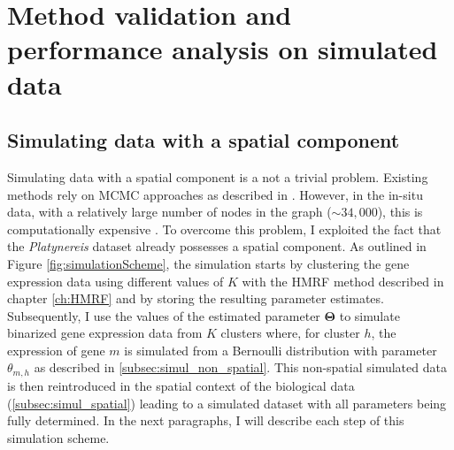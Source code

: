 \chapter{Method validation and performance analysis on simulated data}\label{ch:simulations} 

\section{Simulating data with a spatial component }
Simulating data with a spatial component is a not a trivial problem. Existing methods rely on MCMC approaches as described in \cite{Chalmond89}. However, in the \platy{} in-situ data, with a relatively large number of nodes in the graph ($\sim 34,000$), this is computationally expensive \cite{belloni09}. To overcome this problem, I exploited the fact that the {\it{Platynereis}} dataset already possesses a spatial component. As outlined in Figure \ref{fig:simulationScheme}, the simulation starts by clustering the gene expression data using different values of $K$ with the HMRF method described in chapter \ref{ch:HMRF} and by storing the resulting parameter estimates. Subsequently, I use the values of the estimated parameter $\boldsymbol{\Theta}$ to simulate binarized gene expression data from $K$ clusters where, for cluster $h$, the expression of gene $m$ is simulated from a Bernoulli distribution with parameter $\theta_{m,h}$ as described in \ref{subsec:simul_non_spatial}. This non-spatial simulated data is then reintroduced in the spatial context of the biological data (\ref{subsec:simul_spatial}) leading to a simulated dataset with all parameters being fully determined. In the next paragraphs, I will describe each step of this simulation scheme.

